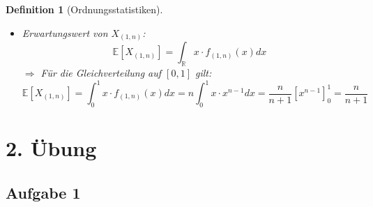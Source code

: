 \documentclass[12pt]{extreport} %
\newcommand{\R}{\mathbb{R}}
\theoremstyle{named}
\theoremstyle{nnamed}
\theoremstyle{itshape}
\newtheorem*{definition}{Definition}
\theoremstyle{normal}
\begin{document}
\begin{definition}[Ordnungsstatistiken]
\begin{itemize}
\begin{itemize}
\begin{align*}
						& \qquad + \begin{pmatrix} n \\2 \end{pmatrix} \cdot F(x)^{n-2} \cdot \left( 1- F(x) \right)^{2} \hspace{4.5cm} \\
						& \qquad \qquad \qquad \qquad \qquad \vdots \\
						& \qquad + \begin{pmatrix} n \\ n-1  \end{pmatrix}  \cdot F(x)^{n - (k-1)} \cdot \left( 1- F(x) \right)^{k-1} \\
						& = \sum_{j=0}^{k-1} \begin{pmatrix} n \\ j  \end{pmatrix} \cdot F(x)^{n-j} \cdot \left( 1 - F(x) \right)^{j}
					\end{align*}
			\end{itemize}
		\item Erwartungswert von $X_{(1,n)}$:
			$$ \mathds{E} [ X_{(1,n)} ] = \int_{\R} x \cdot f_{(1,n)}(x) dx $$
			$\Rightarrow$ Für die Gleichverteilung auf $[0,1]$ gilt:
			$$ \mathds{E}[X_{(1,n)}] = \int_{0}^1 x \cdot f_{(1,n)}(x) dx = n \int_0^1 x \cdot x^{n-1} dx = \frac{n}{n+1} \left[ x^{n-1} \right]_0^1 = \frac{n}{n+1} $$
	\end{itemize}
\end{definition}
	
	
\newpage

\section*{2. Übung}
 
\subsection*{Aufgabe 1}
\end{document}
